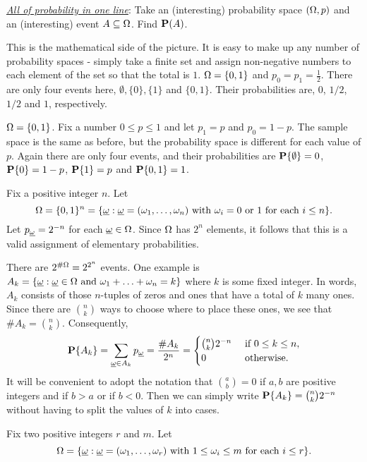 \documentclass[preprint,  11pt]{amsart}
\def\omeg{\underline{\ome}}
\begin{document}
{\em\underline{ All of probability in one line}}: Take an (interesting) probability space $(\Ome, p)$ and an (interesting) event $A\subseteq \Ome$. Find $\P(A)$. 



\vspace{2mm}
This is the mathematical side of the picture. It is easy to make up any number of probability spaces -  simply take a finite set and assign non-negative numbers to each element of the set so that the total is $1$.
\beg $\Ome=\{0,1\}$ and $p_{0}=p_{1}=\frac{1}{2}$. There are only four events here, $\emptyset, \{0\}, \{1\}$ and $\{0,1\}$. Their probabilities are, $0$, $1/2$, $1/2$ and $1$, respectively.
\eeg

\beg\label{eg:onecointoss} $\Ome=\{0,1\}$. Fix a number $0\le p \le 1$ and let $p_{1}=p$ and $p_{0}=1-p$. The sample space is the same as before, but the probability space is different for each value of $p$. Again there are only four events, and their probabilities are $\P\{\emptyset\}=0$, $\P\{0\}=1-p$, $\P\{1\}=p$ and $\P\{0,1\}=1$. 
\eeg

\beg\label{eg:ncointosses} Fix a positive integer $n$. Let $$\Ome=\{0,1\}^{n}=\{\omeg\suchthat \omeg=(\ome_{1},\ldots ,\ome_{n})\mb{ with }\ome_{i}=0\mb{ or }1\mb{ for each }i\le n\}.$$
Let $p_{\omeg}=2^{-n}$ for each $\omeg\in \Ome$. Since $\Ome$ has $2^{n}$ elements, it follows that this is a valid assignment of elementary probabilities.

There are $2^{\#\Ome}=2^{2^{n}}$ events. One example is $A_{k}=\{\omeg\suchthat \omeg\in \Ome \mb{ and } \ome_{1}+\ldots +\ome_{n}=k
\}$ where $k$ is some fixed integer. In words, $A_{k}$ consists of those $n$-tuples of zeros and ones that have a total of $k$ many ones. Since there are $\binom{n}{k}$ ways to choose where to place these ones, we see that $\#A_{k}=\binom{n}{k}$. Consequently,
$$
\P\{A_{k}\}=\sum_{\omeg\in A_{k}}p_{\omeg} = \frac{\# A_{k}}{2^{n}}=\begin{cases} \binom{n}{k}2^{-n} &\mb{ if }0\le k\le n, \\ 0 & \mb{ otherwise}. \end{cases}
$$
It will be convenient to adopt the notation that $\binom{a}{b}=0$ if $a,b$ are positive integers and if $b>a$ or if $b<0$. Then we can simply write $\P\{A_{k}\}=\binom{n}{k}2^{-n}$ without having to split the values of $k$ into cases.
\eeg

\beg\label{eg:rballsinmbins} Fix two positive integers $r$ and $m$. Let 
$$\Ome=\{\omeg\suchthat \omeg=(\ome_{1},\ldots ,\ome_{r}) \mb{ with }1\le \ome_{i} \le m \mb{ for each }i\le r\}.$$
\end{document}
